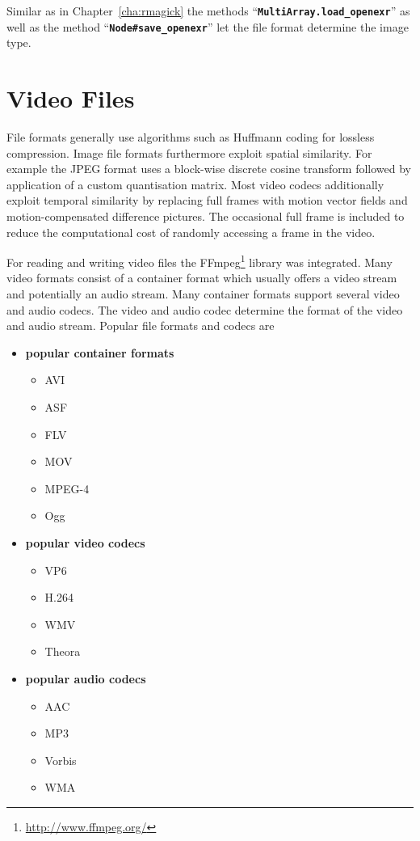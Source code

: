 \documentclass[12pt,a4paper,oneside,openright]{book}
\newcommand{\Eg}{For example }
\newcommand{\cha}[1]{Chapter~\ref{cha:#1}}
\newcommand{\code}[1]{``\texttt{\textbf{\textcolor{codegray}{\small{#1}}}}''}
\begin{document}
\begin{CJK}{UTF8}{}

Similar as in \cha{rmagick} the methods \code{MultiArray.load\_openexr} as well as the method \code{Node\#save\_openexr} let the file format determine the image type.

\section{Video Files}\label{cha:ffmpeg}
File formats generally use algorithms such as Huffmann coding for lossless compression. Image file formats furthermore exploit spatial similarity. \Eg the \ac{JPEG} format uses a block-wise discrete cosine transform followed by application of a custom quantisation matrix. Most video codecs additionally exploit temporal similarity by replacing full frames with motion vector fields and motion-compensated difference pictures. The occasional full frame is included to reduce the computational cost of randomly accessing a frame in the video.

For reading and writing video files the FFmpeg\footnote{\url{http://www.ffmpeg.org/}} library was integrated. Many video formats consist of a container format which usually offers a video stream and potentially an audio stream. Many container formats support several video and audio codecs. The video and audio codec determine the format of the video and audio stream. Popular file formats and codecs are
\begin{itemize}
\item \textbf{popular container formats}
  \begin{itemize}
  \item \acf{AVI}
  \item \acf{ASF}
  \item \acf{FLV}
  \item \acf{MOV}
  \item \acf{MPEG-4}
  \item \acf{Ogg}
  \end{itemize}
\item \textbf{popular video codecs}
  \begin{itemize}
  \item \acf{VP6}
  \item \acf{H.264}
  \item \acf{WMV}
  \item \acf{Theora}
  \end{itemize}
\item \textbf{popular audio codecs}
  \begin{itemize}
  \item \acf{AAC}
  \item \acf{MP3}
  \item \acf{Vorbis}
  \item \acf{WMA}
  \end{itemize}
\end{itemize}


\end{CJK}
\end{document}
